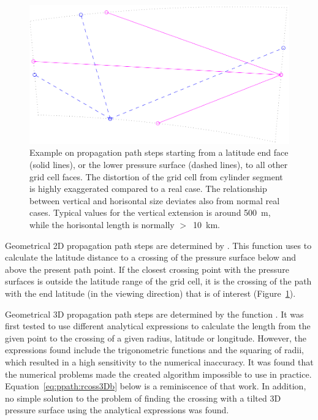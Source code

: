 \begin{figure}[!t]
 \begin{center}
  \includegraphics*[width=0.80\hsize]{Figs/ppath/ppath_ex3}
  \caption{Example on propagation path steps starting from a latitude end face 
    (solid lines), or the lower pressure surface (dashed lines), to
    all other grid cell faces. The distortion of the grid cell from
    cylinder segment is highly exaggerated compared to a real case.
    The relationship between vertical and horisontal size deviates
    also from normal real cases.  Typical values for the vertical
    extension is around 500~m, while the horisontal length is
    normally $>$~10~km.}
  \label{fig:ppath:ex3}  
 \end{center}
\end{figure}

Geometrical 2D propagation path steps are determined by
. This function uses
 to calculate the latitude distance
to a crossing of the pressure surface below and above the present path
point. If the closest crossing point with the pressure surfaces is
outside the latitude range of the grid cell, it is the crossing of the
path with the end latitude (in the viewing direction) that is of
interest (Figure~\ref{fig:ppath:ex3}).



\label{sec:ppath:3Dgeom}

Geometrical 3D propagation path steps are determined by the function
. It was first tested to use different
analytical expressions to calculate the length from the given point to
the crossing of a given radius, latitude or longitude. However, the
expressions found include the trigonometric functions and the squaring
of radii, which resulted in a high sensitivity to the numerical
inaccuracy. It was found that the numerical problems made the created
algorithm impossible to use in practice.
Equation~\ref{eq:ppath:rcoss3Db} below is a reminiscence of that work.
In addition, no simple solution to the problem of finding the crossing
with a tilted 3D pressure surface using the analytical expressions was
found.

